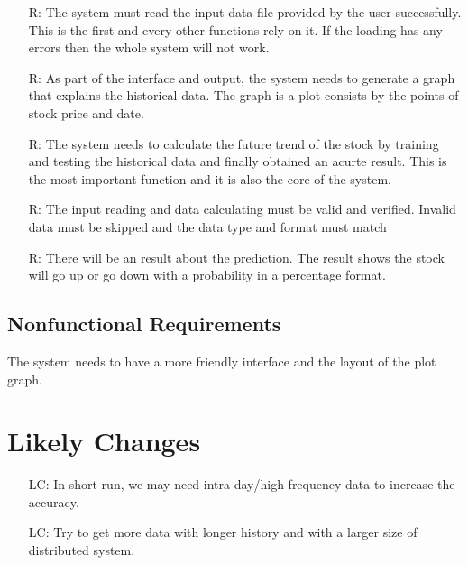 \documentclass[12pt]{article}
\newcounter{reqnum} %
\newcounter{lcnum} %
\begin{document}
\noindent \begin{itemize}

\item[R\refstepcounter{reqnum}\thereqnum \label{R_Inputs}:] The system must read the input data file provided by the user successfully. This is the first and every other functions rely on it. If the loading has any errors then the whole system will not work. 

\item[R\refstepcounter{reqnum}\thereqnum \label{R_OutputInputs}:] As part of the interface and output, the system needs to generate a graph that explains  the historical data. The graph is a plot consists by the points of stock price and date.  


\item[R\refstepcounter{reqnum}\thereqnum \label{R_Calculate}:] The system needs to calculate the future trend of the stock by training and testing the historical data and finally obtained an acurte result. This is the most important function and it is also the core of the system.

\item[R\refstepcounter{reqnum}\thereqnum \label{R_VerifyOutput}:] The input reading and data calculating must be valid and verified. Invalid data must be skipped and the data type and format must match

\item[R\refstepcounter{reqnum}\thereqnum \label{R_Output}:]  There will be an result about the prediction. The result shows the stock will go up or go down with a probability in a percentage format.
\end{itemize}

\subsection{Nonfunctional Requirements}

The system needs to have a more friendly interface and the layout of the plot graph.

\section{Likely Changes}    

\noindent \begin{itemize}

\item[LC\refstepcounter{lcnum}\thelcnum\label{LC1}:] In short run, we may need intra-day/high frequency data to increase the accuracy.
\item[LC\refstepcounter{lcnum}\thelcnum\label{LC2}:] Try to get more data with longer history and with a larger size of distributed system.
\end{itemize}
\end{document}
